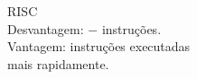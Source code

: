 \documentclass[preview]{standalone}
\begin{document}
RISC\\ Desvantagem: $-$ instruções. \\Vantagem: instruções executadas \\ mais rapidamente.\\
\end{document}
